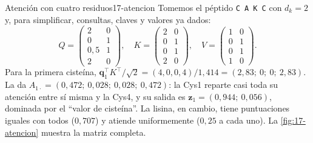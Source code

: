 \begin{ejemplo}{Atención con cuatro residuos}{17-atencion}
Tomemos el péptido \texttt{C A K C} con $d_k=2$ y, para simplificar, consultas, claves y valores ya dados:
\[
Q=\begin{pmatrix}2&0\\0&1\\0{,}5&1\\2&0\end{pmatrix},\quad
K=\begin{pmatrix}2&0\\0&1\\0&1\\2&0\end{pmatrix},\quad
V=\begin{pmatrix}1&0\\0&1\\0&1\\1&0\end{pmatrix}.
\]
Para la primera cisteína, $\mathbf{q}_1^\top K^\top/\sqrt2=(4,0,0,4)/1{,}414=(2{,}83;\ 0;\ 0;\ 2{,}83)$. La  da $A_{1\cdot}=(0{,}472;\ 0{,}028;\ 0{,}028;\ 0{,}472)$: la Cys1 reparte casi toda su atención entre sí misma y la Cys4, y su salida es $\mathbf{z}_1=(0{,}944;\ 0{,}056)$, dominada por el ``valor de cisteína''. La lisina, en cambio, tiene puntuaciones iguales con todos ($0{,}707$) y atiende uniformemente ($0{,}25$ a cada uno). La \cref{fig:17-atencion} muestra la matriz completa.
\end{ejemplo}

